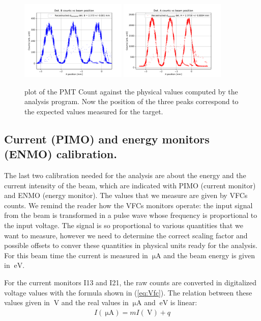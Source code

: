 \begin{figure}[hbtp]
\centering
\includegraphics[width=0.45\textwidth]{Analysis/XcheckB.pdf} 
\includegraphics[width=0.45\textwidth]{Analysis/XcheckA.pdf}
\caption{plot of the PMT Count against the physical values computed by the analysis program. Now the position of the three peaks correspond to the expected values measured for the target.}
\label{fig:CheckHori}
\end{figure}
\newpage

\subsection{Current (PIMO) and energy monitors (ENMO) calibration.} \label{CurrentCalibration}

The last two calibration needed for the analysis are about the energy and the current intensity of the beam, which are indicated with PIMO (current monitor) and ENMO (energy monitor). 
The values that we measure are given by VFCs counts. We remind the reader how the VFCs monitors operate: the input signal from the beam is transformed in a pulse wave whose frequency is proportional to the input voltage.  The signal is so proportional to various quantities that we want to measure, however we need to determine the correct scaling factor and possible offsets to conver these quantities in physical units ready for the analysis. For this beam time the current is measured in $\SI{}{\micro \ampere}$ and the beam energy is given in $\SI{}{\electronvolt}$.\smallskip

For the current monitors I13 and I21, the raw counts are converted in digitalized voltage values with the formula shown in (\ref{eq:Vfc}). The relation between these values given in $\SI{}{\volt}$ and the real values in $\SI{}{\micro \ampere}$ and $\SI{}{\electronvolt}$ is linear:
\begin{align*}
I(\SI{}{\micro \ampere}) = m I(\SI{}{\volt}) + q
\end{align*}

